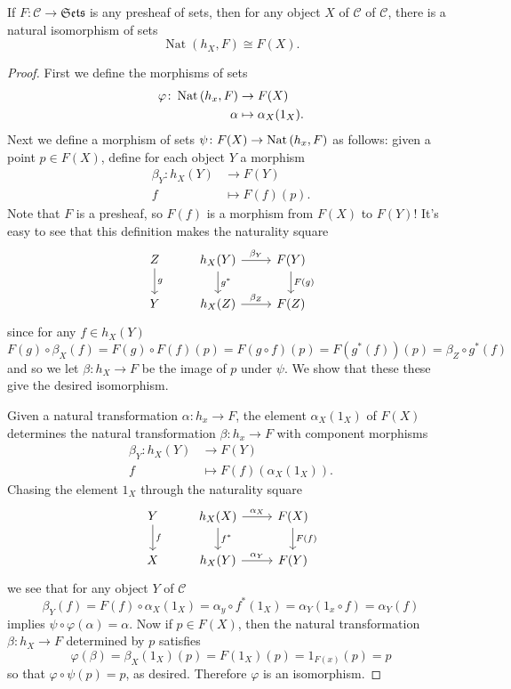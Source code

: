 \documentclass[dissertation.tex]{subfiles}
\begin{document}
\begin{lem}[Yoneda]
  If $F \colon \mathscr{C} \rightarrow \mathfrak{Sets}$ is any presheaf of sets, then for any object $X$ of $\mathscr{C}$ of $\mathscr{C}$, there is a natural isomorphism of sets
  $$\operatorname{Nat}(h_X, F) \cong F(X).$$

  \begin{proof}
    First we define the morphisms of sets
    \begin{align*}
      \varphi \colon \operatorname{Nat}\left(h_x, F\right) &\rightarrow F(X)\\
      \alpha &\mapsto \alpha_X(1_X).
    \end{align*}
    Next we define a morphism of sets $\psi \colon F(X) \rightarrow \operatorname{Nat}\left(h_x, F\right)$ as follows:
    given a point $p \in F(X)$, define for each object $Y$ a morphism
    \begin{align*}
      \beta_Y \colon h_X(Y) &\rightarrow F(Y)\\
      f &\mapsto F(f)(p).
    \end{align*}
    Note that $F$ is a presheaf, so $F(f)$ is a morphism from $F(X)$ to $F(Y)$!
    It's easy to see that this definition makes the naturality square
    $$\begin{tikzcd}
      Z\arrow{d}{g} & h_X(Y)\arrow{d}{g^*}\arrow{r}{\beta_Y} & F(Y)\arrow{d}{F(g)}\\
      Y & h_X(Z)\arrow{r}{\beta_Z} & F(Z)
    \end{tikzcd}$$
    since for any $f \in h_X(Y)$
    $$F(g) \circ \beta_X(f) = F(g) \circ F(f) (p) = F(g \circ f)(p) = F(g^*(f))(p) = \beta_Z \circ g^* (f)$$
    and so we let $\beta : h_X \rightarrow F$ be the image of $p$ under $\psi$.
    We show that these these give the desired isomorphism.

    Given a natural transformation $\alpha \colon h_x \rightarrow F$, the element $\alpha_X(1_X)$ of $F(X)$ determines the natural transformation $\beta : h_x \rightarrow F$ with component morphisms
    \begin{align*}
      \beta_Y \colon h_X(Y) &\rightarrow F(Y)\\
      f &\mapsto F(f)(\alpha_X(1_X)).
    \end{align*}
    Chasing the element $1_X$ through the naturality square
    $$\begin{tikzcd}
      Y\arrow{d}{f} & h_X(X)\arrow{d}{f^*}\arrow{r}{\alpha_X} & F(X)\arrow{d}{F(f)}\\
      X & h_X(Y)\arrow{r}{\alpha_Y} & F(Y)
    \end{tikzcd}$$
    we see that for any object $Y$ of $\mathscr{C}$
    $$\beta_Y(f) = F(f) \circ \alpha_X (1_X) = \alpha_y \circ f^*(1_X) = \alpha_Y(1_x \circ f) = \alpha_Y(f)$$
    implies $\psi \circ \varphi(\alpha) = \alpha$.
    Now if $p \in F(X)$, then the natural transformation $\beta : h_X \rightarrow F$ determined by $p$ satisfies
    $$\varphi(\beta) = \beta_X(1_X)(p) = F(1_X)(p) = 1_{F(x)}(p) = p$$
    so that $\varphi \circ \psi (p) = p$, as desired.
    Therefore $\varphi$ is an isomorphism.


\end{proof}
\end{lem}
\end{document}
